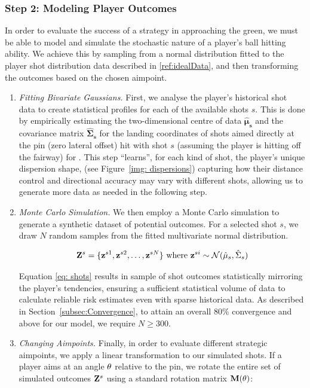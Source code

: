 \documentclass[11pt, letterpaper]{article}
\begin{document}
\subsubsection{Step 2: Modeling Player Outcomes}
\label{subsec: playerSim}
In order to evaluate the success of a strategy in approaching the green, we must be able to model and simulate the stochastic nature of a player's ball hitting ability. We achieve this by sampling from a normal distribution fitted to the player shot distribution data described in \ref{ref:idealData}, and then transforming the outcomes based on the chosen aimpoint.

\begin{enumerate}
    \item \textit{Fitting Bivariate Gaussians.} First, we analyse the player's historical shot data to create statistical profiles for each of the available shots $s$. This is done by empirically estimating the two-dimensional centre of data $\mathbf{\hat\mu_s}$ and the covariance matrix $\mathbf{\hat\Sigma_s}$ for the landing coordinates of shots aimed directly at the pin (zero lateral offset) hit with shot $s$ (assuming the player is hitting off the fairway) for . This step ``learns'', for each kind of shot, the player's unique dispersion shape, (see Figure~\ref{img: dispersions}) capturing how their distance control and directional accuracy may vary with different shots, allowing us to generate more data as needed in the following step.
     \item \textit{Monte Carlo Simulation.} We then employ a Monte Carlo simulation to generate a synthetic dataset of potential outcomes. For a selected shot $s$, we draw $N$ random samples from the fitted multivariate normal distribution. 


     \begin{equation}
         \label{eq: shots}
         \mathbf{Z}^s = \{\mathbf{z}^{s1}, \mathbf{z}^{s2}, \ldots, \mathbf{z}^{sN}\} \text{ where } \mathbf{z}^{si} \sim \mathcal{N}(\hat\mu_s, \hat\Sigma_s)
     \end{equation}

     Equation \eqref{eq: shots} results in sample of shot outcomes statistically mirroring the player's tendencies,  ensuring a sufficient statistical volume of data to calculate reliable risk estimates even with sparse historical data. 
     As described in Section~\ref{subsec:Convergence}, to attain an overall 80\% convergence and above for our model, we require $N \geq 300$.

     \item \textit{Changing Aimpoints.} Finally, in order to evaluate different strategic aimpoints, we apply a linear transformation to our simulated shots. If a player aims at an angle $\theta$ relative to the pin, we rotate the entire set of simulated outcomes $\mathbf{Z}^s$ using a standard rotation matrix $\mathbf{M} (\theta)$: 


\end{enumerate}
\end{document}
